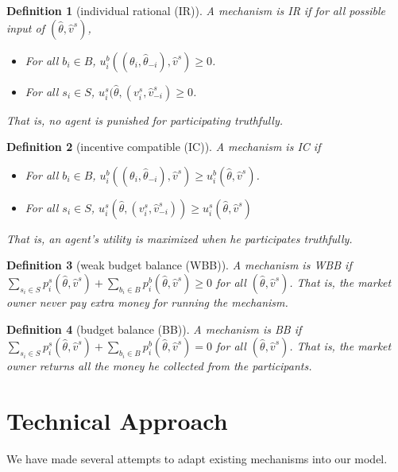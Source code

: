 \documentclass[format=acmsmall, review=false, natbib=false]{acmart}
\newtheorem{definition}{Definition}[section]
\begin{document}
\begin{definition}[individual rational (IR)]
	A mechanism is IR if for all possible input of $(\hat\theta,\hat v^s)$,
	\begin{itemize}
		\item For all $b_i\in B$, $u^b_i((\theta_i,\hat\theta_{-i}),\hat v^s)\geq 0$.
		\item For all $s_i\in S$, $u^s_i(\hat\theta,(v^s_i, \hat v^s_{-i})\geq 0$.
	\end{itemize}
	That is, no agent is punished for participating truthfully.
\end{definition}

\begin{definition}[incentive compatible (IC)]
	A mechanism is IC if
	\begin{itemize}
		\item For all $b_i\in B$,
		      $u^b_i((\theta_i,\hat\theta_{-i}),\hat v^s)
			      \geq u^b_i(\hat\theta,\hat v^s)$.
		\item For all $s_i\in S$,
		      $u^s_i(\hat\theta,(v^s_i,\hat v^s_{-i}))
			      \geq
			      u^s_i(\hat\theta,\hat v^s)$
	\end{itemize}
	That is, an agent's utility is maximized when he participates truthfully.
\end{definition}

\begin{definition}[weak budget balance (WBB)]
	A mechanism is WBB if
	$\sum_{s_i\in S} p^s_i(\hat\theta,\hat v^s)
		+\sum_{b_i\in B} p^b_i(\hat\theta,\hat v^s) \geq 0$
	for all $(\hat\theta,\hat v^s)$.
	That is, the market owner never pay extra money for running the mechanism.
\end{definition}

\begin{definition}[budget balance (BB)]
	A mechanism is BB if
	$\sum_{s_i\in S} p^s_i(\hat\theta,\hat v^s)
		+\sum_{b_i\in B} p^b_i(\hat\theta,\hat v^s) = 0$
	for all $(\hat\theta,\hat v^s)$.
	That is, the market owner returns all the money he collected from the participants.
\end{definition}

\section{Technical Approach}

We have made several attempts to adapt existing mechanisms into our model.
\end{document}
